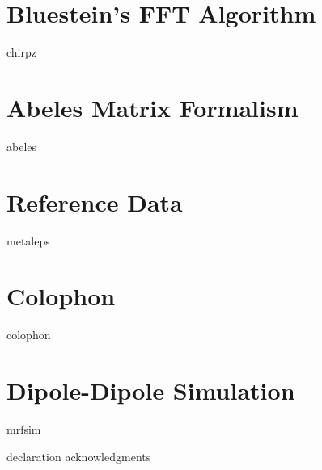 \documentclass[12pt,a4paper,titlepage,onecolumn]{report}
\begin{document}
\section{Bluestein's FFT Algorithm}
{chirpz}
\section{Abeles Matrix Formalism}\label{ch:abeles}
{abeles}
\section{Reference Data}\label{ch:reference}
{metaleps}
\section{Colophon}
{colophon}
\section{Dipole-Dipole Simulation}\label{sec:mrfsim}
{mrfsim}




{declaration}
{acknowledgments}
\end{document}
